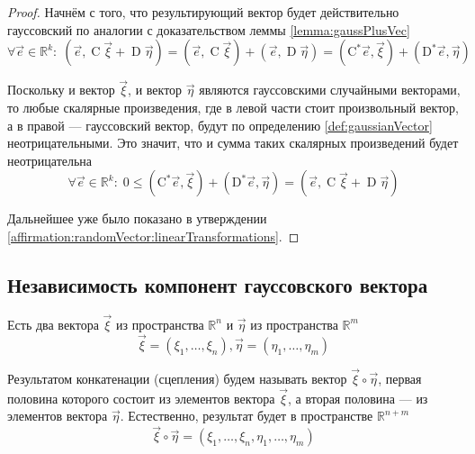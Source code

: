 \begin{proof}
    Начнём с того, что результирующий вектор будет действительно гауссовский по
    аналогии с доказательством леммы \ref{lemma:gaussPlusVec}
    $$\forall \vec{e} \in \mathbb{R}^k:\;
        \left( \vec{e}, \operatorname{C} \vec{\xi} + \operatorname{D} \vec{\eta}
                \right)
            = \left( \vec{e}, \operatorname{C} \vec{\xi} \right)
                + \left( \vec{e}, \operatorname{D} \vec{\eta} \right)
            = \left( \operatorname{C^*} \vec{e}, \vec{\xi} \right)
                + \left( \operatorname{D^*} \vec{e}, \vec{\eta} \right)$$

    Поскольку и вектор $\vec{\xi}$, и вектор $\vec{\eta}$ являются гауссовскими
    случайными векторами, то любые скалярные произведения, где в левой части
    стоит произвольный вектор, а в правой --- гауссовский вектор, будут по
    определению \ref{def:gaussianVector} неотрицательными. Это значит, что и
    сумма таких скалярных произведений будет неотрицательна
    $$\forall \vec{e} \in \mathbb{R}^k:\;
        0 \le \left( \operatorname{C^*} \vec{e}, \vec{\xi} \right)
                + \left( \operatorname{D^*} \vec{e}, \vec{\eta} \right)
        = \left( \vec{e}, \operatorname{C} \vec{\xi}
                + \operatorname{D} \vec{\eta} \right)$$

    Дальнейшее уже было показано в утверждении
    \ref{affirmation:randomVector:linearTransformations}.
\end{proof}

\subsection{Независимость компонент гауссовского вектора}

\begin{definition}
    Есть два вектора $\vec{\xi}$ из пространства $\mathbb{R}^n$ и $\vec{\eta}$
    из пространства $\mathbb{R}^m$
    $$\vec{\xi} = \left( \xi_1, \dots, \xi_n \right),
        \vec{\eta} = \left( \eta_1, \dots, \eta_m \right)$$

    Результатом конкатенации (сцепления) будем называть вектор
    $\vec{\xi} \circ \vec{\eta}$, первая половина которого состоит из
    элементов вектора $\vec{\xi}$, а вторая половина --- из элементов вектора
    $\vec{\eta}$. Естественно, результат будет в пространстве $\mathbb{R}^{n+m}$
    $$\vec{\xi} \circ \vec{\eta}
        = \left( \xi_1, \dots, \xi_n, \eta_1, \dots, \eta_m \right)$$
\end{definition}

